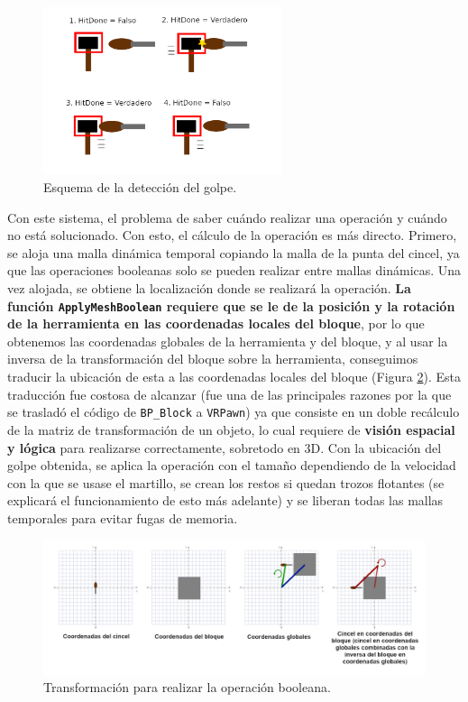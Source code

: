\begin{figure}[H]
	\centering
	\includegraphics[width=7cm]{imagenes/hitdone}
	\caption{Esquema de la detección del golpe.}
	\label{fig:hitdone}
\end{figure}

Con este sistema, el problema de saber cuándo realizar una operación y cuándo no está solucionado. Con esto, el cálculo de la operación es más directo. Primero, se aloja una malla dinámica temporal copiando la malla de la punta del cincel, ya que las operaciones booleanas solo se pueden realizar entre mallas dinámicas. Una vez alojada, se obtiene la localización donde se realizará la operación. \textbf{La función \texttt{ApplyMeshBoolean} requiere que se le de la posición y la rotación de la herramienta en las coordenadas locales del bloque}, por lo que obtenemos las coordenadas globales de la herramienta y del bloque, y al usar la inversa de la transformación del bloque sobre la herramienta, conseguimos traducir la ubicación de esta a las coordenadas locales del bloque (Figura \ref{fig:transformacion}). Esta traducción fue costosa de alcanzar (fue una de las principales razones por la que se trasladó el código de \texttt{BP\_Block} a \texttt{VRPawn}) ya que consiste en un doble recálculo de la matriz de transformación de un objeto, lo cual requiere de \textbf{visión espacial y lógica} para realizarse correctamente, sobretodo en 3D. Con la ubicación del golpe obtenida, se aplica la operación con el tamaño dependiendo de la velocidad con la que se usase el martillo, se crean los restos si quedan trozos flotantes (se explicará el funcionamiento de esto más adelante) y se liberan todas las mallas temporales para evitar fugas de memoria.

\begin{figure}[H]
	\centering
	\includegraphics[width=12.5cm]{imagenes/transformacion}
	\caption{Transformación para realizar la operación booleana.}
	\label{fig:transformacion}
\end{figure}

